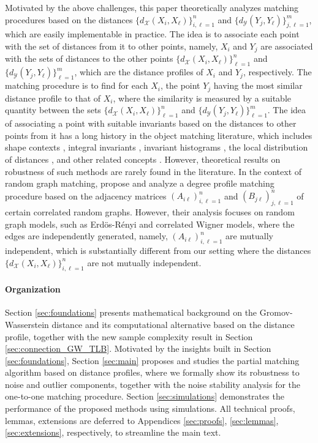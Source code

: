 \documentclass[11pt,letterpaper]{article}
\theoremstyle{definition}
\numberwithin{equation}{section}
\newcommand{\cX}{\mathcal{X}}
\newcommand{\cY}{\mathcal{Y}}
\begin{document}
Motivated by the above challenges, this paper theoretically analyzes matching procedures based on the distances $\{d_\cX(X_i, X_\ell)\}_{i, \ell = 1}^{n}$ and $\{d_\cY(Y_j, Y_\ell)\}_{j, \ell = 1}^{m}$, which are easily implementable in practice. The idea is to associate each point with the set of distances from it to other points, namely, $X_i$ and $Y_j$ are associated with the sets of distances to the other points $\{d_\cX(X_i, X_\ell)\}_{\ell = 1}^{n}$ and $\{d_\cY(Y_j, Y_\ell)\}_{\ell = 1}^{m}$, which are the distance profiles of $X_i$ and $Y_j$, respectively. The matching procedure is to find for each $X_i$, the point $Y_j$ having the most similar distance profile to that of $X_i$, where the similarity is measured by a suitable quantity between the sets $\{d_\cX(X_i, X_\ell)\}_{\ell = 1}^{n}$ and $\{d_\cY(Y_j, Y_\ell)\}_{\ell = 1}^{m}$. The idea of associating a point with suitable invariants based on the distances to other points from it has a long history in the object matching literature, which includes shape contexts \citep{belongie2002shape,ruggeri2008isometry}, integral invariants \citep{manay2006integral}, invariant histograms \citep{brinkman2012invariant}, the local distribution of distances \citep{memoli2011gromov}, and other related concepts \citep{gortler2019generic,norelli2023asif}. However, theoretical results on robustness of such methods are rarely found in the literature. In the context of random graph matching, \cite{ding2021efficient,ding2023efficiently} propose and analyze a degree profile matching procedure based on the adjacency matrices $(A_{i \ell})_{i, \ell = 1}^{n}$ and $(B_{j \ell})_{j, \ell = 1}^{n}$ of certain correlated random graphs. However, their analysis focuses on random graph models, such as Erd{\"o}s-R{\'e}nyi and correlated Wigner models, where the edges are independently generated, namely, $(A_{i \ell})_{i, \ell = 1}^{n}$ are mutually independent, which is substantially different from our setting where the distances $\{d_\cX(X_i, X_\ell)\}_{i, \ell = 1}^{n}$ are not mutually independent.

\paragraph{Organization} Section \ref{sec:foundations} presents mathematical background on the Gromov-Wasserstein distance and its computational alternative based on the distance profile, together with the new sample complexity result in Section \ref{sec:connection_GW_TLB}. Motivated by the insights built in Section \ref{sec:foundations}, Section \ref{sec:main} proposes and studies the partial matching algorithm based on distance profiles, where we formally show its robustness to noise and outlier components, together with the noise stability analysis for the one-to-one matching procedure. Section \ref{sec:simulations} demonstrates the performance of the proposed methods using simulations. All technical proofs, lemmas, extensions are deferred to Appendices \ref{sec:proofs}, \ref{sec:lemmas}, \ref{sec:extensions}, respectively, to streamline the main text.
\end{document}

